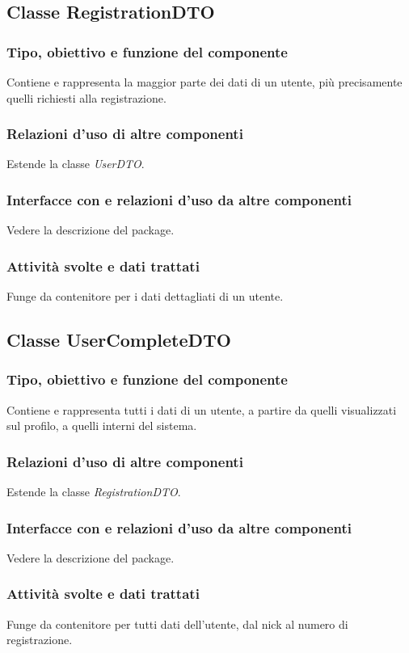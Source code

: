 \subsection{Classe RegistrationDTO}
\subsubsection*{Tipo, obiettivo e funzione del componente}
Contiene e rappresenta la maggior parte dei dati di un utente, pi\`u
precisamente quelli richiesti alla registrazione.
\subsubsection*{Relazioni d'uso di altre componenti}
Estende la classe \textit{UserDTO}.
\subsubsection*{Interfacce con e relazioni d'uso da altre componenti}
Vedere la descrizione del package.
\subsubsection*{Attivit\`a svolte e dati trattati}
Funge da contenitore per i dati dettagliati di un utente.

\subsection{Classe UserCompleteDTO}
\subsubsection*{Tipo, obiettivo e funzione del componente}
Contiene e rappresenta tutti i dati di un utente, a partire da quelli
visualizzati sul profilo, a quelli interni del sistema.
\subsubsection*{Relazioni d'uso di altre componenti}
Estende la classe \textit{RegistrationDTO}.
\subsubsection*{Interfacce con e relazioni d'uso da altre componenti}
Vedere la descrizione del package.
\subsubsection*{Attivit\`a svolte e dati trattati}
Funge da contenitore per tutti dati dell'utente, dal nick al numero di
registrazione.

